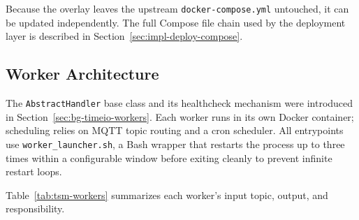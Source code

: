 Because the overlay leaves the upstream \texttt{docker-compose.yml} untouched, it
can be updated independently. The full Compose file chain used by the deployment layer is
described in Section~\ref{sec:impl-deploy-compose}.

\subsection{Worker Architecture}
\label{sec:impl-tsm-workers}

The \texttt{AbstractHandler} base class and its healthcheck mechanism were introduced in
Section~\ref{sec:bg-timeio-workers}. Each worker runs in its own Docker container; scheduling
relies on MQTT topic routing and a cron scheduler. All entrypoints use
\texttt{worker\_launcher.sh}, a Bash wrapper that restarts the process up to three times
within a configurable window before exiting cleanly to prevent infinite restart loops.

Table~\ref{tab:tsm-workers} summarizes each worker's input topic, output, and responsibility.

